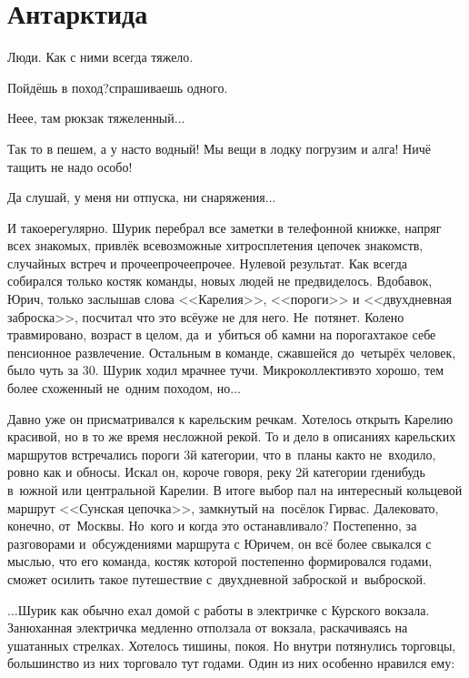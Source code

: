 {
	\chapter{Антарктида}
	\vepsianrose
	
	\fancyhead[LE]{\fancyplain{}{\bfseries \parttitle}}
	\fancyhead[RO]{\fancyplain{}{\bfseries \rightmark}}
	
	Люди. Как с ними всегда тяжело.
	
	\diagdash Пойдёшь в поход?\mdash спрашиваешь одного.
	
	\diagdash Не\sdash е\sdash е, там рюкзак тяжеленный$\ldots$
	
	\diagdash Так то в пешем, а у нас\sdash то водный! Мы вещи в лодку погрузим и алга! Ничё тащить не надо особо!
	
	\diagdash Да слушай, у меня ни отпуска, ни снаряжения$\ldots$
	
	И такое\mdash регулярно. Шурик перебрал все заметки в телефонной книжке, напряг всех знакомых, привлёк всевозможные хитросплетения цепочек знакомств, случайных встреч и прочее\sdash прочее\sdash прочее. Нулевой результат. Как всегда собирался только костяк команды, новых людей не предвиделось. Вдобавок, Юрич, только заслышав слова <<Карелия>>, <<пороги>> и <<двухдневная заброска>>, посчитал что это всё\mdash уже не для него. Не~потянет. Колено травмировано, возраст в целом, да~и~убиться об камни на порогах\mdash такое себе пенсионное развлечение. Остальным в команде, сжавшейся до~четырёх человек, было чуть за 30. Шурик ходил мрачнее тучи. Микроколлектив\mdash это хорошо, тем более схоженный не~одним походом, но$\ldots$
	
	Давно уже он присматривался к карельским речкам. Хотелось открыть Карелию красивой, но в то же время несложной рекой. То и дело в описаниях карельских маршрутов встречались пороги 3\sdash й категории, что в~планы как\sdash то не~входило, ровно как и обносы. Искал он, короче говоря, реку 2\sdash й категории где\sdash нибудь в~южной или центральной Карелии. В итоге выбор пал на интересный кольцевой маршрут <<Сунская цепочка>>, замкнутый на~посёлок Гирвас. Далековато, конечно, от~Москвы. Но~кого и когда это останавливало? Постепенно, за разговорами и~обсуждениями маршрута с Юричем, он всё более свыкался с мыслью, что его команда, костяк которой постепенно формировался годами, сможет осилить такое путешествие с~двухдневной заброской и~выброской. 
	
	\vspace{0.4cm}
	$\ldots$Шурик как обычно ехал домой с работы в электричке с Курского вокзала. Занюханная электричка медленно отползала от вокзала, раскачиваясь на ушатанных стрелках. Хотелось тишины, покоя. Но внутри потянулись торговцы, большинство из них торговало тут годами. Один из них особенно нравился ему:
	
}

